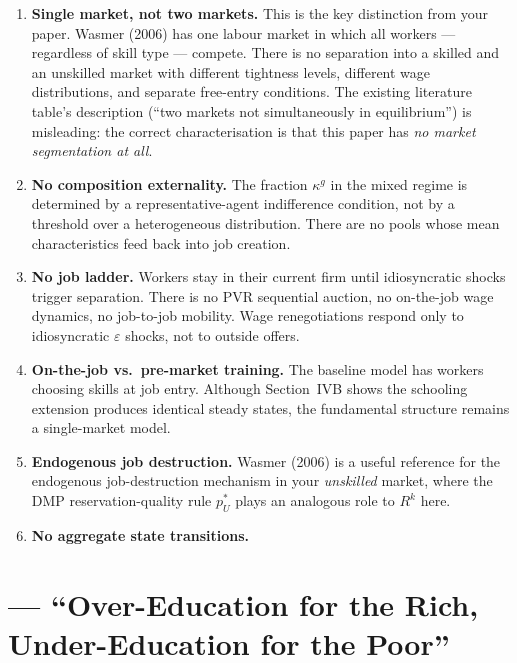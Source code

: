 \documentclass[12pt]{article}
\begin{document}
\begin{enumerate}
    \item \textbf{Single market, not two markets.} This is the key distinction from your paper. Wasmer (2006) has one labour market in which all workers --- regardless of skill type --- compete. There is no separation into a skilled and an unskilled market with different tightness levels, different wage distributions, and separate free-entry conditions. The existing literature table's description (``two markets not simultaneously in equilibrium'') is misleading: the correct characterisation is that this paper has \emph{no market segmentation at all}.

    \item \textbf{No composition externality.} The fraction $\kappa^g$ in the mixed regime is determined by a representative-agent indifference condition, not by a threshold over a heterogeneous distribution. There are no pools whose mean characteristics feed back into job creation.

    \item \textbf{No job ladder.} Workers stay in their current firm until idiosyncratic shocks trigger separation. There is no PVR sequential auction, no on-the-job wage dynamics, no job-to-job mobility. Wage renegotiations respond only to idiosyncratic $\varepsilon$ shocks, not to outside offers.

    \item \textbf{On-the-job vs.\ pre-market training.} The baseline model has workers choosing skills at job entry. Although Section~IVB shows the schooling extension produces identical steady states, the fundamental structure remains a single-market model.

    \item \textbf{Endogenous job destruction.} Wasmer (2006) is a useful reference for the endogenous job-destruction mechanism in your \emph{unskilled} market, where the DMP reservation-quality rule $p_U^*$ plays an analogous role to $R^k$ here.

    \item \textbf{No aggregate state transitions.}
\end{enumerate}


\section{\citet{charlot2010} --- ``Over-Education for the Rich, Under-Education for the Poor''}
\end{document}
